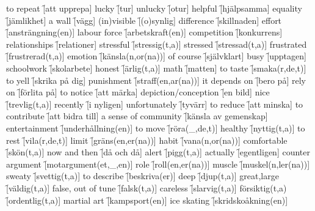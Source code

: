 \begin{questions}
    \begin{multicols}{2}
        \raggedcolumns
        \question to repeat \f[att upprepa]
        \question lucky \f[tur]
        \question unlucky \f[otur]
        \question helpful \f[hjälpsamma]
        \question equality \f[jämlikhet]
        \question a wall \f[vägg]
        \question (in)visible \f[(o)synlig]
        \question difference \f[skillnaden]
        \question effort \f[ansträngning(en)]
        \question labour force \f[arbetskraft(en)]
        \question competition \f[konkurrens]
        \question relationships \f[relationer]
        \question stressful \f[stressig(t,a)]
        \question stressed \f[stressad(t,a)]
        \question frustrated \f[frustrerad(t,a)]
        \question emotion \f[känsla(n,or(na))]
        \question of course \f[självklart]
        \question busy \f[upptagen]
        \question schoolwork \f[skolarbete]
        \question honest \f[ärlig(t,a)]
        \question math \f[matten]
        \question to taste \f[smaka(r,de,t)]
        \question to yell \f[skrika på dig]
        \question punishment \f[straff(en,ar(na))]
        \question it depends on \f[bero på]
        \question rely on \f[förlita på]
        \question to notice \f[att märka]
        \question depiction/conception \f[en bild]
        \question nice \f[trevlig(t,a)]
        \question recently \f[i nyligen]
        \question unfortunately \f[tyvärr]
        \question to reduce \f[att minska]
        \question to contribute \f[att bidra till]
        \question a sense of community \f[känsla av gemenskap]
        \question entertainment \f[underhållning(en)]
        \question to move \f[röra(\_,de,t)]
        \question healthy \f[nyttig(t,a)]
        \question to rest \f[vila(r,de,t)]
        \question limit \f[gräns(en,er(na))]
        \question habit \f[vana(n,or(na))]
        \question comfortable \f[skön(t,a)]
        \question now and then \f[då och då]
        \question alert \f[pigg(t,a)]
        \question actually \f[egentligen]
        \question counter argument \f[motargument(et,\_,en)]
        \question role \f[roll(en,er(na))]
        \question muscle \f[muskel(n,ler(na))]
        \question sweaty \f[svettig(t,a)]
        \question to describe \f[beskriva(er)]
        \question deep \f[djup(t,a)]
        \question great,large \f[väldig(t,a)]
        \question false, out of tune \f[falsk(t,a)]
        \question careless \f[slarvig(t,a)]
        \question försiktig(t,a) \f[ordentlig(t,a)]
        \question martial art \f[kampsport(en)]
        \question ice skating \f[skridskoåkning(en)]

\end{multicols}
\end{questions}
